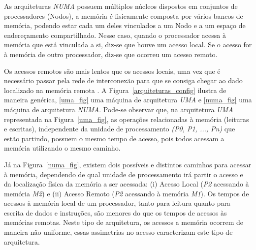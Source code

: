 \documentclass[diss,capa]{texufpel}
\begin{document}
As arquiteturas \emph{NUMA} possuem múltiplos núcleos dispostos em conjuntos de processadores (Nodos), a memória é fisicamente composta por vários bancos de memória, podendo estar cada um deles vinculados a um Nodo e a um espaço de endereçamento compartilhado. Nesse caso, quando o processador acessa à memória que está vinculada a si, diz-se que houve um acesso local. Se o acesso for à memória de outro processador, diz-se que ocorreu um acesso remoto.

Os acessos remotos são mais lentos que os acessos locais, uma vez que é necessário passar pela rede de interconexão para que se consiga chegar ao dado localizado na memória remota \cite{Rodolfo:2014}. A Figura~\ref{arquiteturas_config} ilustra de maneira genérica, \ref{uma_fig} uma máquina de arquitetura \emph{UMA} e \ref{numa_fig} uma máquina de arquitetura \emph{NUMA}. Pode-se observar que, na arquitetura \emph{UMA} representada na Figura~\ref{uma_fig}, as operações relacionadas à memória (leituras e escritas), independente da unidade de processamento \emph{(P0, P1, ..., Pn)} que estão partindo, possuem o mesmo tempo de acesso, pois todos acessam a memória utilizando o mesmo caminho.

Já na Figura~\ref{numa_fig}, existem dois possíveis e distintos caminhos para acessar à memória, dependendo de qual unidade de processamento irá partir o acesso e da localização física da memória a ser acessada: (i) Acesso Local (\emph{P2} acessando à memória \emph{M2}) e (ii) Acesso Remoto (\emph{P2} acessando à memória \emph{M1}). Os tempos de acessos à memória local de um processador, tanto para leitura quanto para escrita de dados e instruções, são menores do que os tempos de acessos às memórias remotas. Neste tipo de arquitetura, os acessos a memória ocorrem de maneira não uniforme, essas assimetrias no acesso caracterizam este tipo de arquitetura.
\end{document}
